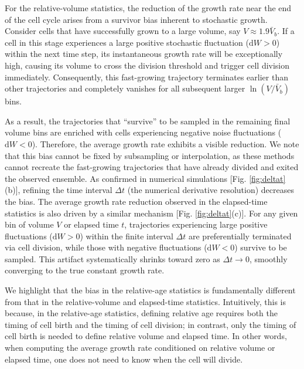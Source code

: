 \documentclass[aps, prl, longbibliography, linenumbers, superscriptaddress]{revtex4-2}
\newcommand{\blue}{\color{blue}}
\newcommand{\blue}{}
\begin{document}
{\blue For the relative-volume statistics, the reduction of the growth rate near the end of the cell cycle arises from a survivor bias inherent to stochastic growth. Consider cells that have successfully grown to a large volume, say $V \approx 1.9\bar{V}_b$. If a cell in this stage experiences a large positive stochastic fluctuation ($\mathrm{d}W > 0$) within the next time step, its instantaneous growth rate will be exceptionally high, causing its volume to cross the division threshold and trigger cell division immediately. Consequently, this fast-growing trajectory terminates earlier than other trajectories and completely vanishes for all subsequent larger $\ln(V/\bar{V}_b)$ bins. 
	
As a result, the trajectories that “survive” to be sampled in the remaining final volume bins are enriched with cells experiencing negative noise fluctuations ($\mathrm{d}W < 0$). Therefore, the average growth rate exhibits a visible reduction. We note that this bias cannot be fixed by subsampling or interpolation, as these methods cannot recreate the fast-growing trajectories that have already divided and exited the observed ensemble. As confirmed in numerical simulations [Fig. \ref{fig:deltat}(b)], refining the time interval $\Delta t$ (the numerical derivative resolution) decreases the bias. The average growth rate reduction observed in the elapsed-time statistics is also driven by a similar mechanism [Fig. \ref{fig:deltat}(c)]. For any given bin of volume $V$ or elapsed time $t$, trajectories experiencing large positive fluctuations ($\mathrm{d}W > 0$) within the finite interval $\Delta t$ are preferentially terminated via cell division, while those with negative fluctuations ($\mathrm{d}W < 0$) survive to be sampled. This artifact systematically shrinks toward zero as $\Delta t \to 0$, smoothly converging to the true constant growth rate.
	
We highlight that the bias in the relative-age statistics is fundamentally different from that in the relative-volume and elapsed-time statistics. Intuitively, this is because, in the relative-age statistics, defining relative age requires both the timing of cell birth and the timing of cell division; in contrast, only the timing of cell birth is needed to define relative volume and elapsed time. In other words, when computing the average growth rate conditioned on relative volume or elapsed time, one does not need to know when the cell will divide.}
\end{document}
